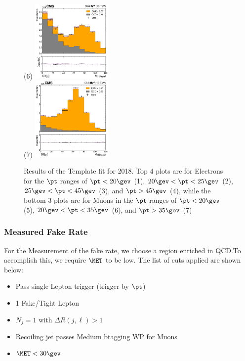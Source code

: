 \begin{figure}
  \subfigure(6) \includegraphics[width=0.35\textwidth]{template_fit/2018/mt_high_Muon_20.0.png} \\
  \subfigure(7) \includegraphics[width=0.35\textwidth]{template_fit/2018/mt_high_Muon_35.0.png}
  \caption{Results of the Template fit for 2018. Top 4 plots are for Electrons for the $\pt$ ranges of $\pt < 20\gev$ (1), $20\gev<\pt<25\gev$ (2), $25\gev<\pt<45\gev$ (3), and $\pt>45\gev$ (4), while the bottom 3 plots are for Muons in the $\pt$ ranges of $\pt < 20\gev$ (5), $20\gev<\pt<35\gev$ (6), and $\pt>35\gev$ (7)}
\end{figure}

\subsubsection{Measured Fake Rate}\label{sec:nonprompt:measurement}

For the Measurement of the fake rate, we choose a region enriched in QCD.\@ To accomplish this, we require $\MET$ to be low. The list of cuts applied are shown below:

\begin{itemize}
  \item Pass single Lepton trigger (trigger by $\pt$)
  \item 1 Fake/Tight Lepton
  \item $N_{j} = 1$ with $\Delta R(j, \ell) > 1$
  \item Recoiling jet passes Medium btagging WP for Muons
  \item $\MET < 30\gev$
\end{itemize}

